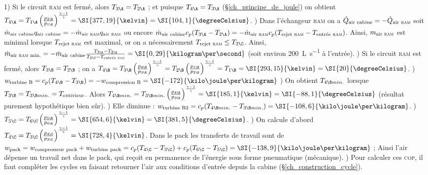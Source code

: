 \begin{description}
			\tab\onlyframabook{\tab} 1) Si le circuit \textsc{ram} est fermé, alors $T_{3\A} = T_{2\A}$ ; et puisque $T_{4\A} = T_{3\A}$ (\S\ref{ch_principe_de_joule}) on obtient $T_{4\A}
			= T_{1\A} \left(\frac{p_{2\B}}{p_{1\B}}\right)^{\frac{\gamma-1}{\gamma}}
			= \SI{377,19}{\kelvin} = \SI{104,1}{\degreeCelsius}$.
			) Dans l’échangeur \textsc{ram} on a 
				$\dot Q_\text{air cabine} = - \dot Q_\text{air \textsc{ram}}$ soit 
				$\dot m_\text{air cabine} q_\text{air cabine} =  -\dot m_\text{air \textsc{ram}} q_\text{air \textsc{ram}}$ ou encore
				$\dot m_\text{air cabine} c_p(T_{3\A} - T_{2\A}) = -\dot m_\text{air \textsc{ram}} c_p(T_\text{rejet \textsc{ram}} - T_\text{entrée \textsc{ram}})$. Ainsi, $m_\text{air \textsc{ram}}$ est minimal lorsque $T_\text{rejet \textsc{ram}}$ est maximal, or on a nécessairement $T_\text{rejet \textsc{ram}} \leq T_{2\C}$. Ainsi, 
				$\dot m_\text{air \textsc{ram} min.} = -\dot m_\text{air cabine} \frac{T_{3\A} - T_{2\A}}{T_{2\C} - T_\text{entrée \textsc{ram}}} = \SI{0,29}{\kilogram\per\second}$ (soit environ \SI{200}{\liter\per\second} à l’entrée).				
			) Si le circuit \textsc{ram} est fermé, alors $T_{3\B} = T_{2\B}$ ; on a $T_{4\B} 
			= T_{3\B} \left(\frac{p_{4\B}}{p_{3\B}}\right)^{\frac{\gamma-1}{\gamma}}
			= T_{2\B} \left(\frac{p_{1\B}}{p_{2\B}}\right)^{\frac{\gamma-1}{\gamma}}
			= T_{1\B} = \SI{293,15}{\kelvin} = \SI{20}{\degreeCelsius}$.
			) $w_\text{turbine B} = c_p (T_{4\B} - T_{3\B}) = -w_\text{compression B} = \SI{-172}{\kilo\joule\per\kilogram}$
			) On obtient $T_{4\B min.}$ lorsque $T_{3\B} = T_{3\B min.} = T_\text{extérieur}$. Alors $T_{4\B min.} = T_{3\B min.} \left(\frac{p_{4\B}}{p_{3\B}}\right)^{\frac{\gamma-1}{\gamma}} = \SI{185,1}{\kelvin} = \SI{-88,1}{\degreeCelsius}$ (résultat purement hypothétique bien sûr).
			) Elle diminue : $w_\text{turbine B2} = c_p (T_{4\B min.} - T_{3\B min.}) = \SI{-108,6}{\kilo\joule\per\kilogram}$.
			) $T_{5\C} = T_{6\C} \left(\frac{p_{5\B}}{p_{6\B}}\right)^{\frac{\gamma-1}{\gamma}} = \SI{654,6}{\kelvin} = \SI{381,5}{\degreeCelsius}$. 
			) On calcule d’abord $T_{4\C} = T_{3\C} \left(\frac{p_{4\C}}{p_{3\C}}\right)^{\frac{\gamma-1}{\gamma}} = \SI{728,4}{\kelvin}$. Dans le pack les transferts de travail sont de $w_\text{pack} 
			= w_\text{compresseur pack} + w_\text{turbine pack}
			= c_p(T_{4\C} - T_{3\C}) + c_p(T_{6\C} - T_{5\C})
			= \SI{-138,9}{\kilo\joule\per\kilogram}$ ;
			Ainsi l’air dépense un travail net dans le pack, qui reçoit en permanence de l’énergie sous forme pneumatique (mécanique).
			) Pour calculer ces \textsc{cop}, il faut compléter les cycles en faisant retourner l’air aux conditions d’entrée depuis la cabine (\S\ref{ch_construction_cycle}). 

\end{description}
